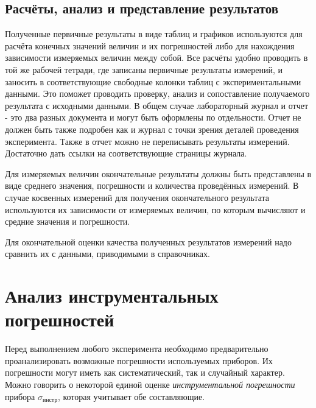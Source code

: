 \subsection{Расчёты, анализ и представление результатов}

Полученные первичные результаты в виде таблиц и графиков используются
для расчёта конечных значений величин и их погрешностей либо для нахождения
зависимости измеряемых величин между собой. Все расчёты удобно проводить
в той же рабочей тетради, где записаны первичные результаты измерений,
и заносить в соответствующие свободные колонки таблиц с экспериментальными
данными. Это поможет проводить проверку, анализ и сопоставление получаемого
результата с исходными данными. В общем случае лабораторный журнал и отчет - это два разных документа и могут быть оформлены по отдельности. Отчет не должен быть также подробен как и журнал с точки зрения деталей проведения эксперимента. Также в отчет можно не переписывать результаты измерений. Достаточно дать ссылки на соответствующие страницы журнала. 

Для измеряемых величин окончательные результаты должны быть представлены
в виде среднего значения, погрешности и количества проведённых измерений.
В случае косвенных измерений для получения окончательного результата
используются их зависимости от измеряемых величин, по которым вычисляют
и средние значения и погрешности.

Для окончательной оценки качества полученных результатов измерений
надо сравнить их с данными, приводимыми в справочниках.


\section{Анализ инструментальных погрешностей}

Перед выполнением любого эксперимента необходимо предварительно проанализировать
возможные погрешности используемых приборов. Их погрешности могут
иметь как систематический, так и случайный характер. Можно говорить
о некоторой единой оценке \emph{инструментальной погрешности} прибора
$\sigma_{\text{инстр}}$, которая учитывает обе составляющие.

